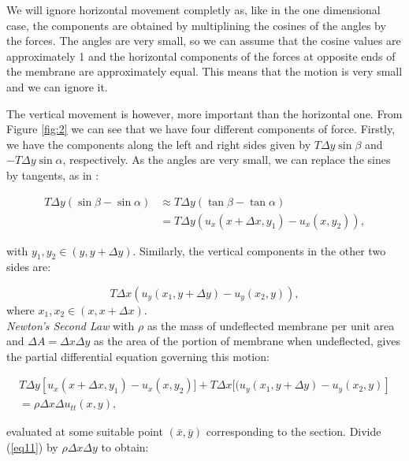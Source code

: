 \documentclass[a4paper, 12pt]{article}
\numberwithin{equation}{section}
\begin{document}
We will ignore horizontal movement completly as, like in the one dimensional case, the components are obtained by multiplining the cosines of 
the angles by the forces. The angles are very small, so we can assume that the cosine values are approximately 1 and the horizontal 
components of the forces at opposite ends of the membrane are approximately equal. This means that the motion is very small and we can ignore it.

The vertical movement is however, more important than the horizontal one. From Figure \ref{fig:2} we can see that we have four different components of force.
Firstly, we have the components along the left and right sides given by $T\Delta y \sin\beta$ and $-T\Delta y\sin\alpha$, respectively. As the 
angles are very small, we can replace the sines by tangents, as in \cite{Kr}:

\begin{equation} \label{eq9}
\begin{split} 
    T\Delta y(\sin\beta - \sin\alpha) & \approx T\Delta y(\tan\beta-\tan\alpha)\\
    &= T\Delta y(u_x(x+\Delta x, y_1)-u_x(x, y_2)), 
\end{split}
\end{equation}

with $y_1, y_2 \in(y, y+\Delta y)$. Similarly, the vertical components in the other two sides are:

\begin {equation} \label{eq10}
    T\Delta x(u_y(x_1, y+\Delta y)-u_y(x_2,y)),
\end{equation}
where $x_1, x_2 \in(x, x+\Delta x)$.
\\

\emph{Newton's Second Law} with $\rho$ as the mass of undeflected membrane per unit area and $\Delta A=\Delta x\Delta y$ as the area of the portion
of membrane when undeflected, gives the partial differential equation governing this motion:

\begin{equation} \label{eq11}
    \begin{split}
    T\Delta y\left[u_x(x+\Delta x, y_1)-u_x(x, y_2)]+T\Delta x[(u_y(x_1, y+\Delta y)-u_y(x_2,y)\right]\\
    =\rho\Delta x\Delta u_{tt}(x,y),
\end{split}
\end{equation}

evaluated at some suitable point $(\bar{x},\bar{y})$ corresponding to the section. Divide (\ref{eq11}) by $\rho\Delta x\Delta y$ to obtain:
\end{document}
